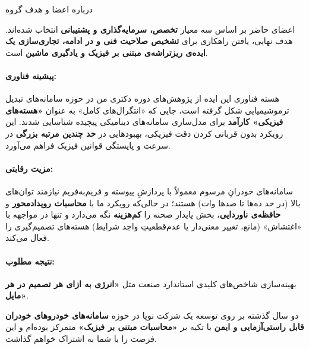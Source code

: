\documentclass[10pt]{report}
\newcommand{\highlight}[1]{\textcolor{primaryBlue}{\textbf{#1}}}
\begin{document}
\begin{mainbox}{درباره اعضا و هدف گروه}
\begin{center}
\begin{minipage}{0.9\textwidth}
اعضای حاضر بر اساس سه معیار \highlight{تخصص، سرمایه‌گذاری و پشتیبانی} انتخاب شده‌اند. هدف نهایی، یافتن راهکاری برای \highlight{تشخیص صلاحیت فنی و در ادامه، تجاری‌سازی یک ایده‌ی ریزتراشه‌ی مبتنی بر فیزیک و یادگیری ماشین} است.
\end{minipage}
\end{center}

\vspace{0.8em}

\noindent\begin{minipage}{\textwidth}
\paragraph{پیشینه فناوری:} 
هسته فناوری این ایده از پژوهش‌های دوره دکتری من در حوزه سامانه‌های تبدیل ترموشیمیایی شکل گرفته است، جایی که «انتگرال‌های کامل» به عنوان \highlight{«هسته‌های فیزیکی» کارآمد} برای مدل‌سازی سامانه‌های دینامیکی پیچیده شناسایی شدند. این رویکرد بدون قربانی کردن دقت فیزیکی، بهبودهایی در \highlight{حد چندین مرتبه بزرگی} در سرعت و پایستگی قوانین فیزیک فراهم می‌آورد.
\end{minipage}

\vspace{0.8em}

\noindent\begin{minipage}{\textwidth}
\paragraph{مزیت رقابتی:}
سامانه‌های خودرانِ مرسوم معمولاً با پردازشِ پیوسته و فریم‌به‌فریم نیازمند توان‌های بالا (در حد ده‌ها تا صدها وات) هستند؛ در حالی‌که رویکرد ما با \highlight{محاسبات رویدادمحور} و \highlight{حافظه‌ی ناوردایی}، بخش پایدار صحنه را \highlight{کم‌هزینه} نگه می‌دارد و تنها در مواجهه با «اغتشاش» (مانع، تغییر معنی‌دار یا عدم‌قطعیتِ واجد شرایط) هسته‌های تصمیم‌گیری را فعال می‌کند.
\end{minipage}

\vspace{0.8em}

\noindent\begin{minipage}{\textwidth}
\paragraph{نتیجه مطلوب:} 
بهینه‌سازی شاخص‌های کلیدی استاندارد صنعت مثل \highlight{«انرژی به ازای هر تصمیم در هر مایل»}.

\vspace{0.5em}
دو سال گذشته بر روی توسعه یک شرکت نوپا در حوزه \highlight{سامانه‌های خودروهای خودران قابل راستی‌آزمایی و ایمن} با تکیه بر \highlight{«محاسبات مبتنی بر فیزیک»} متمرکز بوده‌ام و این فرصت را با شما به اشتراک خواهم گذاشت.
\end{minipage}
\end{mainbox}
\end{document}
